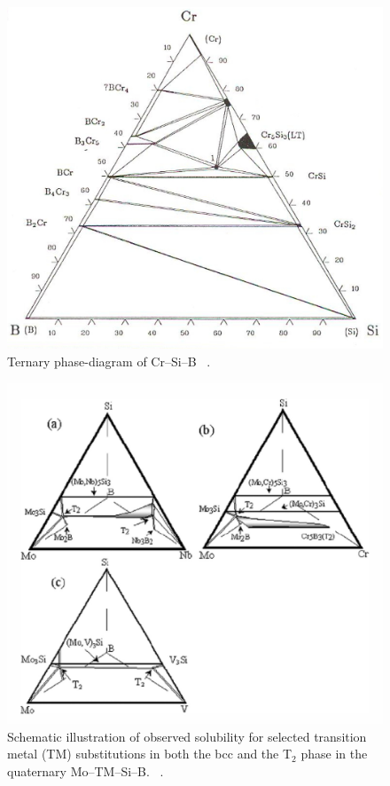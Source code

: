 %
\vspace{2cm}
\begin{figure}[H]
\begin{center}
\includegraphics[width=\textwidth]{CrSiB}
\caption{Ternary phase-diagram of Cr--Si--B ~\cite{nowotny58}.}
\label{fig:CrSiB}
\end{center}
\end{figure}
%
\begin{figure}[H]
\begin{center}
\includegraphics[width=\textwidth]{T2_alloying}
\caption{Schematic illustration of observed solubility for selected transition metal (TM) substitutions in both the bcc and the T$_2$ phase in the quaternary Mo--TM--Si--B. ~\cite{sakidja05}.}
\label{fig:T2_alloying}
\end{center}
\end{figure}
\vspace{-.5cm}
%
